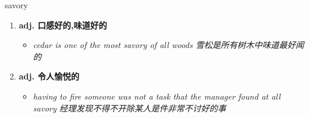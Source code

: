 
\begin{frame}
{\huge savory}
\begin{center}
\begin{enumerate}\Large
  \item \textbf{adj. 口感好的,味道好的}
  \begin{itemize}
    \item \em{\Large{cedar is one of the most savory of all woods 雪松是所有树木中味道最好闻的}}
  \end{itemize}
  \item \textbf{adj. 令人愉悦的}
  \begin{itemize}
    \item \em{\Large{having to fire someone was not a task that the manager found at all savory 经理发现不得不开除某人是件非常不讨好的事}}
  \end{itemize}
\end{enumerate}
\end{center}
\end{frame}
